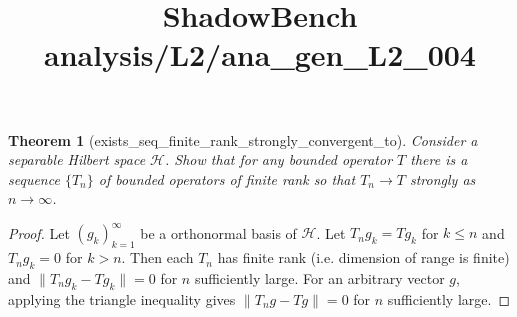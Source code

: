 \documentclass{article}
\title{ShadowBench analysis/L2/ana\_gen\_L2\_004}
\newtheorem{theorem}{Theorem}
\begin{document}
\maketitle

\begin{theorem}[exists_seq_finite_rank_strongly_convergent_to]
Consider a separable Hilbert space $\mathcal{H}$.
Show that for any bounded operator $T$ there is a sequence $\{T_n\}$ of bounded operators of finite rank so that $T_n \to T$ strongly as $n \to \infty$.
\end{theorem}

\begin{proof}
Let $(g_k)_{k=1}^{\infty}$ be a orthonormal basis of $\mathcal{H}$. Let $T_n g_k = T g_k$ for $k \le n$ and $T_n g_k = 0$ for $k > n$. Then each $T_n$ has finite rank (i.e. dimension of range is finite) and $\|T_n g_k - T g_k\| = 0$ for $n$ sufficiently large. For an arbitrary vector $g$, applying the triangle inequality gives $\|T_n g - T g\| = 0$ for $n$ sufficiently large.
\end{proof}
\end{document}
